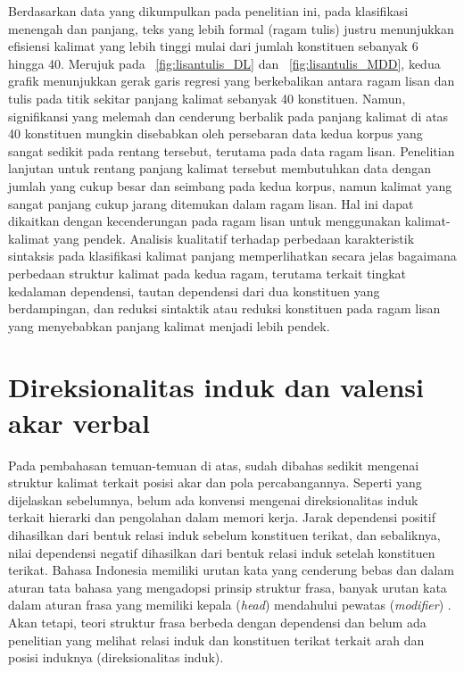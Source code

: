 Berdasarkan data yang dikumpulkan pada penelitian ini, pada klasifikasi menengah dan panjang, teks yang lebih formal (ragam tulis) justru menunjukkan efisiensi kalimat yang lebih tinggi mulai dari jumlah konstituen sebanyak 6 hingga 40. Merujuk pada \pic~\ref{fig:lisantulis_DL} dan \pic~\ref{fig:lisantulis_MDD}, kedua grafik menunjukkan gerak garis regresi yang berkebalikan antara ragam lisan dan tulis pada titik sekitar panjang kalimat sebanyak 40 konstituen. Namun, signifikansi yang melemah dan cenderung berbalik pada panjang kalimat di atas 40 konstituen mungkin disebabkan oleh persebaran data kedua korpus yang sangat sedikit pada rentang tersebut, terutama pada data ragam lisan. Penelitian lanjutan untuk rentang panjang kalimat tersebut membutuhkan data dengan jumlah yang cukup besar dan seimbang pada kedua korpus, namun kalimat yang sangat panjang cukup jarang ditemukan dalam ragam lisan. Hal ini dapat dikaitkan dengan kecenderungan pada ragam lisan untuk menggunakan kalimat-kalimat yang pendek. Analisis kualitatif terhadap perbedaan karakteristik sintaksis pada klasifikasi kalimat panjang memperlihatkan secara jelas bagaimana perbedaan struktur kalimat pada kedua ragam, terutama terkait tingkat kedalaman dependensi, tautan dependensi dari dua konstituen yang berdampingan, dan reduksi sintaktik atau reduksi konstituen pada ragam lisan yang menyebabkan panjang kalimat menjadi lebih pendek.

\section{Direksionalitas induk dan valensi akar verbal}
Pada pembahasan temuan-temuan di atas, sudah dibahas sedikit mengenai struktur kalimat terkait posisi akar dan pola percabangannya. Seperti yang dijelaskan sebelumnya, belum ada konvensi mengenai direksionalitas induk terkait hierarki dan pengolahan dalam memori kerja. Jarak dependensi positif dihasilkan dari bentuk relasi induk sebelum konstituen terikat, dan sebaliknya, nilai dependensi negatif dihasilkan dari bentuk relasi induk setelah konstituen terikat. Bahasa Indonesia memiliki urutan kata yang cenderung bebas \citep{sneddon2010indonesian} dan dalam aturan tata bahasa yang mengadopsi prinsip struktur frasa, banyak urutan kata dalam aturan frasa yang memiliki kepala (\textit{head}) mendahului pewatas (\textit{modifier}) \citep{sneddon2010indonesian}. Akan tetapi, teori struktur frasa berbeda dengan dependensi dan belum ada penelitian yang melihat relasi induk dan konstituen terikat terkait arah dan posisi induknya (direksionalitas induk). 

